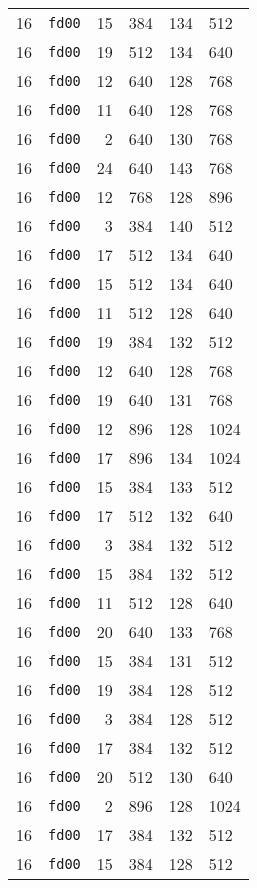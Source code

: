 \documentclass{article}
\begin{document}
\begin{table}[h!]
\begin{tabular}{llrrrl}
    16 & \texttt{fd00} & 15 & 384 & 134 & 512 \\
    16 & \texttt{fd00} & 19 & 512 & 134 & 640 \\
    16 & \texttt{fd00} & 12 & 640 & 128 & 768 \\
    16 & \texttt{fd00} & 11 & 640 & 128 & 768 \\
    16 & \texttt{fd00} & 2 & 640 & 130 & 768 \\
    16 & \texttt{fd00} & 24 & 640 & 143 & 768 \\
    16 & \texttt{fd00} & 12 & 768 & 128 & 896 \\
    16 & \texttt{fd00} & 3 & 384 & 140 & 512 \\
    16 & \texttt{fd00} & 17 & 512 & 134 & 640 \\
    16 & \texttt{fd00} & 15 & 512 & 134 & 640 \\
    16 & \texttt{fd00} & 11 & 512 & 128 & 640 \\
    16 & \texttt{fd00} & 19 & 384 & 132 & 512 \\
    16 & \texttt{fd00} & 12 & 640 & 128 & 768 \\
    16 & \texttt{fd00} & 19 & 640 & 131 & 768 \\
    16 & \texttt{fd00} & 12 & 896 & 128 & 1024 \\
    16 & \texttt{fd00} & 17 & 896 & 134 & 1024 \\
    16 & \texttt{fd00} & 15 & 384 & 133 & 512 \\
    16 & \texttt{fd00} & 17 & 512 & 132 & 640 \\
    16 & \texttt{fd00} & 3 & 384 & 132 & 512 \\
    16 & \texttt{fd00} & 15 & 384 & 132 & 512 \\
    16 & \texttt{fd00} & 11 & 512 & 128 & 640 \\
    16 & \texttt{fd00} & 20 & 640 & 133 & 768 \\
    16 & \texttt{fd00} & 15 & 384 & 131 & 512 \\
    16 & \texttt{fd00} & 19 & 384 & 128 & 512 \\
    16 & \texttt{fd00} & 3 & 384 & 128 & 512 \\
    16 & \texttt{fd00} & 17 & 384 & 132 & 512 \\
    16 & \texttt{fd00} & 20 & 512 & 130 & 640 \\
    16 & \texttt{fd00} & 2 & 896 & 128 & 1024 \\
    16 & \texttt{fd00} & 17 & 384 & 132 & 512 \\
    16 & \texttt{fd00} & 15 & 384 & 128 & 512 \\

\end{tabular}
\end{table}
\end{document}
